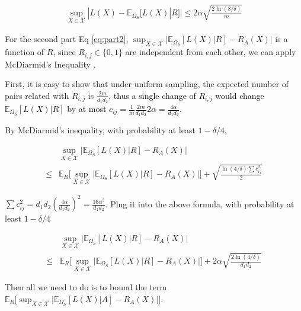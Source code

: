 \documentclass[conference]{IEEEtran}
\numberwithin{equation}{section}
\newcommand{\laks}[1]{\textcolor{black}{#1}}
\newcommand{\supX}{\sup_{X \in \mathcal{X}}}
\newcommand{\E}{\mathbb{E}}
\newtheorem{sampling strategy}{Sampling Strategy}
\begin{document}
\begin{equation}
    \begin{aligned}
        \supX |L(X) - \mathbb{E}_{\Omega_S} [L(X) | R] | \leq 2 \alpha \sqrt{\frac{2\ln(8/\delta)}{m}}
        \label{eq:res_part1}
    \end{aligned}
\end{equation}

For the second part Eq \ref{eq:part2}, $\supX \big|\mathbb{E}_{\Omega_S} [L(X) | R] - R_A(X) \big|$ is a function of $R$, since $R_{i,j} \in \{0, 1\}$ are independent from each other, we can apply McDiarmid's Inequality \cite{Mc}.

First, it is easy to show that under uniform sampling, the expected number of pairs related with $R_{i,j}$ is $\frac{2m}{d_1 d_2}$, \laks{thus a single change of $R_{i,j}$ would  change $\E_{\Omega_S}[L(X)|R] $ by at most $c_{ij} = \frac{1}{m} \frac{2m}{d_1 d_2} 2\alpha = \frac{4 \alpha }{d_1 d_2} $.} 

By McDiarmid's inequality, with probability at least $1 - \delta/4$,

\begin{equation}
    \begin{aligned}
    & \sup_{X \in \mathcal{X}} \big| \mathbb{E}_{\Omega_S} [L(X) | R] - R_A(X) \big| \\
    \leq & \mathbb{E}_R \Big[ \sup_{X \in \mathcal{X}} \big|\mathbb{E}_{\Omega_S} [L(X) | R] - R_A(X) \big| \Big] + \sqrt{ \frac{\ln(4/\delta) \sum c_{ij}^2 }{2} } \nonumber
    \end{aligned}
\end{equation}

$\sum c_{ij}^2 = d_1 d_2 (\frac{4\alpha}{d_1 d_2})^2 = \frac{16 \alpha^2}{d_1 d_2}$. Plug it into the above formula, with probability at least $1 - \delta/4$

\begin{equation}
    \begin{aligned}
    & \sup_{X \in \mathcal{X}} \big| \mathbb{E}_{\Omega_S} [L(X) | R] - R_A(X) \big| \\
    \leq & \mathbb{E}_R \Big[ \sup_{X \in \mathcal{X}} \big|\mathbb{E}_{\Omega_S} [L(X) | R] - R_A(X) \big| \Big]  + 2\alpha \sqrt{ \frac{2\ln(4/\delta) }{d_1 d_2} }  \label{eq:res_part2}
    \end{aligned}
\end{equation}

Then all we need to do is to bound the term $\mathbb{E}_R \Big[ \sup_{X \in \mathcal{X}} \big|\mathbb{E}_{\Omega_S} [L(X) | A] - R_A(X) \big| \Big]$.
\end{document}
